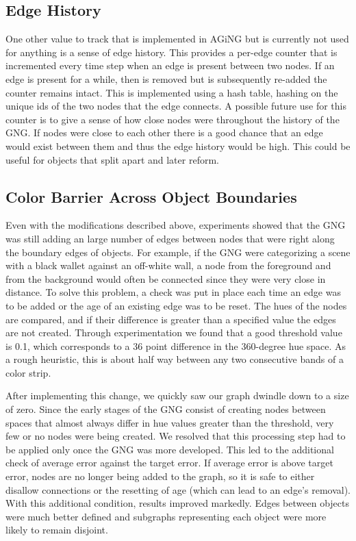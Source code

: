 \documentclass{article}
\renewcommand{\|}{\origbar} %
\begin{document}
\subsection{Edge History}

One other value to track that is implemented in AGiNG but is currently not used for anything is a sense of edge history. This provides a per-edge counter that is incremented every time step when an edge is present between two nodes. If an edge is present for a while, then is removed but is subsequently re-added the counter remains intact. This is implemented using a hash table, hashing on the unique ids of the two nodes that the edge connects. A possible future use for this counter is to give a sense of how close nodes were throughout the history of the GNG. If nodes were close to each other there is a good chance that an edge would exist between them and thus the edge history would be high. This could be useful for objects that split apart and later reform.

\subsection{Color Barrier Across Object Boundaries}

Even with the modifications described above, experiments showed that the GNG was still adding an large number of edges between nodes that were right along the boundary edges of objects. For example, if the GNG were categorizing a scene with a black wallet against an off-white wall, a node from the foreground and from the background would often be connected since they were very close in distance. To solve this problem, a check was put in place each time an edge was to be added or the age of an existing edge was to be reset. The hues of the nodes are compared, and if their difference is greater than a specified value the edges are not created. Through experimentation we found that a good threshold value is 0.1, which corresponds to a 36 point difference in the 360-degree hue space. As a rough heuristic, this is about half way between any two consecutive bands of a color strip.

After implementing this change, we quickly saw our graph dwindle down to a size of zero. Since the early stages of the GNG consist of creating nodes between spaces that almost always differ in hue values greater than the threshold, very few or no nodes were being created. We resolved that this processing step had to be applied only once the GNG was more developed. This led to the additional check of average error against the target error. If average error is above target error, nodes are no longer being added to the graph, so it is safe to either disallow connections or the resetting of age (which can lead to an edge's removal). With this additional condition, results improved markedly. Edges between objects were much better defined and subgraphs representing each object were more likely to remain disjoint.
\end{document}
